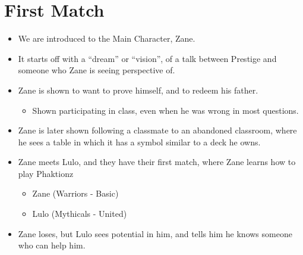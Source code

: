 \section{First Match}
\begin{itemize}
    \item We are introduced to the Main Character, Zane.
    \item It starts off with a “dream” or “vision”, of a talk between Prestige and someone who Zane is seeing perspective of.
    \item Zane is shown to want to prove himself, and to redeem his father. 
    \begin{itemize}
        \item Shown participating in class, even when he was wrong in most questions.
    \end{itemize}
    \item Zane is later shown following a classmate to an abandoned classroom, where he sees a table in which it has a symbol similar to a deck he owns.
    \item Zane meets Lulo, and they have their first match, where Zane learns how to play Phaktionz
    \begin{itemize}
        \item Zane (Warriors - Basic)
        \item Lulo (Mythicals - United)
    \end{itemize}
    \item Zane loses, but Lulo sees potential in him, and tells him he knows someone who can help him.
\end{itemize}